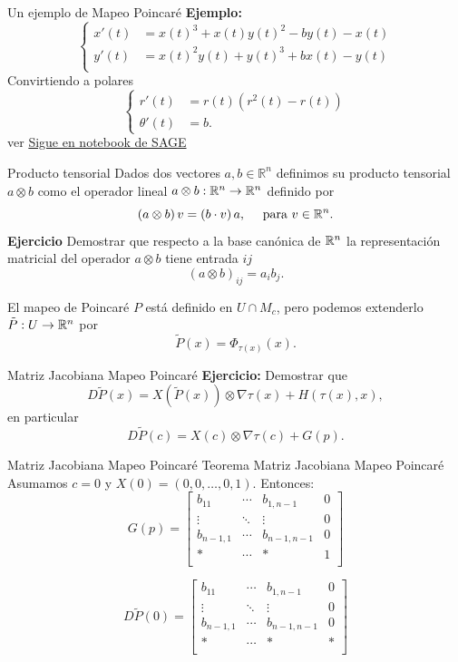 {Un ejemplo de Mapeo Poincaré}
\textbf{Ejemplo:} 
 \[\begin{cases} x'(t)&= x\left(t\right)^{3} + x\left(t\right)
y\left(t\right)^{2} - b y\left(t\right) - x\left(t\right)\\
y'(t) &= x\left(t\right)^{2} y\left(t\right) +
y\left(t\right)^{3} + b x\left(t\right) - y\left(t\right)\\   
  \end{cases}\]
Convirtiendo a polares
\[
 \begin{cases}
  r'(t)&=r(t)(r^2(t)-r(t))\\
  \theta'(t)&=b.
 \end{cases}
\]
ver \href{http://sage.ccad.unrc.edu.ar/home/pub/63/}{Sigue en notebook de SAGE}


{Producto tensorial}
Dados dos vectores $a,b\in\mathbb{R}^n$ definimos su producto tensorial $a\otimes b$ como el operador lineal  $a\otimes b:\mathbb{R}^n\to\mathbb{R}^n$ definido por
\[\left(a\otimes b\right)v=\left(b\cdot v\right)a,\quad \text{ para } v\in\mathbb{R}^n.\]
\textbf{Ejercicio} Demostrar que respecto a la base canónica de  $\mathbb{R}^n$ la representación matricial del operador $a\otimes b$ tiene entrada $ij$
\[\left(a\otimes b\right)_{ij}=a_ib_j.\]

El mapeo de Poincaré $P$ está definido en $U\cap M_c$, pero podemos extenderlo $\tilde{P}:U\to\mathbb{R}^n$ por
\[\tilde{P}(x)=\Phi_{\tau(x)}(x).\]




{Matriz Jacobiana Mapeo Poincaré}
\textbf{Ejercicio:} Demostrar que
\[D\tilde{P}(x)=X(\tilde{P}(x))\otimes\nabla\tau(x)+H(\tau(x),x),\]
en particular
\[D\tilde{P}(c)=X(c)\otimes\nabla\tau(c)+G(p).\]



{Matriz Jacobiana Mapeo Poincaré}
{Teorema Matriz Jacobiana Mapeo Poincaré}
 Asumamos $c=0$ y $X(0)=(0,0,\ldots,0,1)$. Entonces:
 \begin{equation}\label{gp}G(p)=\begin{bmatrix}
         b_{11}&\cdots&b_{1,n-1}&0\\
        \vdots &\ddots&\vdots&0\\
         b_{n-1,1}&\cdots&b_{n-1,n-1}&0\\
         *&\cdots&*&1\\
        \end{bmatrix}
 \end{equation}
 
 \begin{equation}\label{dptil}D\tilde{P}(0)=\begin{bmatrix}
         b_{11}&\cdots&b_{1,n-1}&0\\
        \vdots &\ddots&\vdots&0\\
         b_{n-1,1}&\cdots&b_{n-1,n-1}&0\\
         *&\cdots&*&*\\
        \end{bmatrix}
\end{equation}






